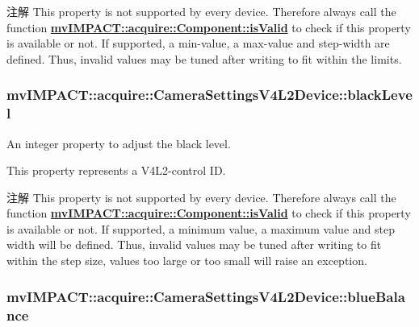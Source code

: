 \begin{DoxyNote}{注解}
This property is not supported by every device. Therefore always call the function {\bfseries \hyperlink{classmv_i_m_p_a_c_t_1_1acquire_1_1_component_ac51e55e7e046101f3c6119d84123abd5}{mv\+I\+M\+P\+A\+C\+T\+::acquire\+::\+Component\+::is\+Valid}} to check if this property is available or not. If supported, a min-\/value, a max-\/value and step-\/width are defined. Thus, invalid values may be tuned after writing to fit within the limits. 
\end{DoxyNote}
\hypertarget{classmv_i_m_p_a_c_t_1_1acquire_1_1_camera_settings_v4_l2_device_a5b72046d92aa57699fd3cd6be2cfcba3}{
\subsubsection[{black\+Level}]{ mv\+I\+M\+P\+A\+C\+T\+::acquire\+::\+Camera\+Settings\+V4\+L2\+Device\+::black\+Level}}\label{classmv_i_m_p_a_c_t_1_1acquire_1_1_camera_settings_v4_l2_device_a5b72046d92aa57699fd3cd6be2cfcba3}


An integer property to adjust the black level. 

This property represents a V4\+L2-\/control I\+D. \begin{DoxyNote}{注解}
This property is not supported by every device. Therefore always call the function {\bfseries \hyperlink{classmv_i_m_p_a_c_t_1_1acquire_1_1_component_ac51e55e7e046101f3c6119d84123abd5}{mv\+I\+M\+P\+A\+C\+T\+::acquire\+::\+Component\+::is\+Valid}} to check if this property is available or not. If supported, a minimum value, a maximum value and step width will be defined. Thus, invalid values may be tuned after writing to fit within the step size, values too large or too small will raise an exception. 
\end{DoxyNote}
\hypertarget{classmv_i_m_p_a_c_t_1_1acquire_1_1_camera_settings_v4_l2_device_a45a31558e0487169e66763231ed41434}{
\subsubsection[{blue\+Balance}]{ mv\+I\+M\+P\+A\+C\+T\+::acquire\+::\+Camera\+Settings\+V4\+L2\+Device\+::blue\+Balance}}\label{classmv_i_m_p_a_c_t_1_1acquire_1_1_camera_settings_v4_l2_device_a45a31558e0487169e66763231ed41434}


